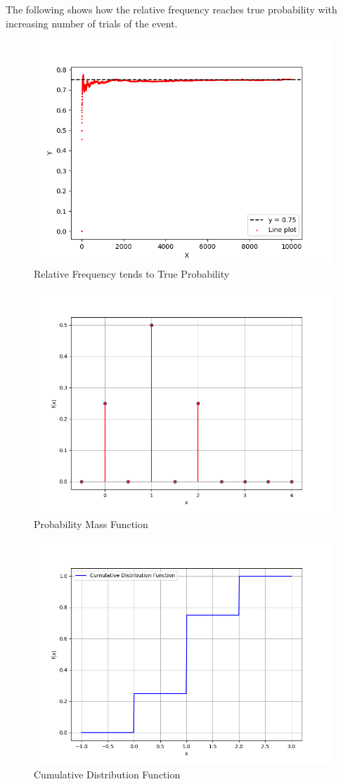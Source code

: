 \documentclass[journal]{IEEEtran}
\begin{document}
The following shows how the relative frequency reaches true probability with increasing number of trials of the event.
\begin{figure}[h!]
   \centering
   \includegraphics[width=0.7\columnwidth]{figs/fig.png}
    \caption{Relative Frequency tends to True Probability}
\end{figure}
\begin{figure}[h!]
   \centering
   \includegraphics[width=0.7\columnwidth]{figs/fig1.png}
    \caption{Probability Mass Function}
\end{figure}
\begin{figure}[h!]
   \centering
   \includegraphics[width=0.7\columnwidth]{figs/fig2.png}
    \caption{Cumulative Distribution Function}
\end{figure}
\end{document}
